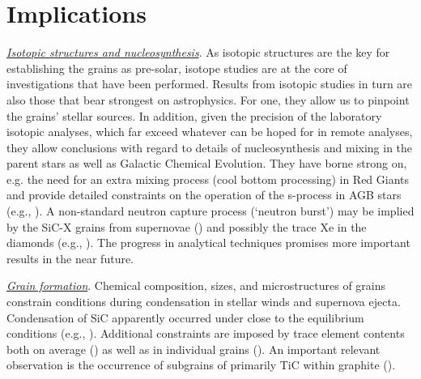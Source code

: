 \documentclass{iau}
\begin{document}
\section{Implications}

{\underline{\it Isotopic structures and nucleosynthesis}}. As isotopic structures are the key for
establishing the grains as pre-solar, isotope studies are at the core of investigations that have
been performed. Results from isotopic studies in turn are also those that bear strongest on
astrophysics. For one, they allow us to pinpoint the grains' stellar sources. In addition, given the
precision of the laboratory isotopic analyses, which far exceed whatever can be hoped for in
remote analyses, they allow conclusions with regard to details of nucleosynthesis and mixing
in the parent stars as well as Galactic Chemical Evolution. They have borne strong on, e.g. the
need for an extra mixing process (cool bottom processing) in Red Giants and provide detailed
constraints on the operation of the s-process in AGB stars (e.g., 
\cite[Busso et al. 1999]{Busso_etal99}). 
A non-standard neutron capture process (`neutron burst') may be implied by the SiC-X grains from supernovae 
(\cite[Meyer et al. 2000]{Meyer_etal00}) and possibly the trace Xe in the diamonds (e.g., 
\cite[Ott 2002]{Ott02}).
The progress in analytical techniques promises more important results in the near future.

{\underline{\it Grain formation}}. Chemical composition, sizes, and microstructures of grains constrain
conditions during condensation in stellar winds and supernova ejecta. Condensation of SiC
apparently occurred under close to the equilibrium conditions (e.g., 
\cite[Lodders \& Fegley 1998]{LoddersFegley98}).
Additional constraints are imposed by trace element contents both on average 
(\cite[Yin et al. 2006]{Yin_etal06}) 
as well as in individual grains 
(\cite[Amari et al. 1995]{Amari_etal95}). 
An important relevant observation is
the occurrence of subgrains of primarily TiC within graphite 
(\cite[Croat et al. 2005]{Croat_etal05}).
\end{document}
